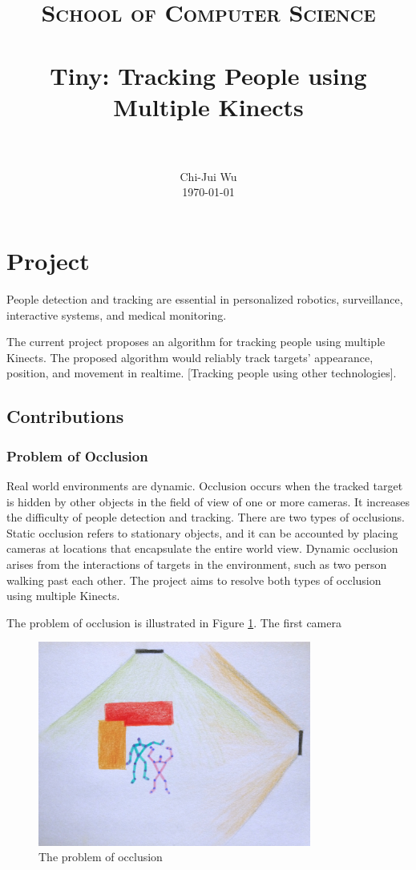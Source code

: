 \documentclass[paper=a4, fontsize=11pt]{scrartcl}
\title{
		\usefont{OT1}{bch}{b}{n}
		\normalfont \normalsize \textsc{School of Computer Science} \\ [25pt]
		\horrule{0.5pt} \\[0.4cm]
		\huge Tiny: Tracking People using Multiple Kinects \\
		\horrule{2pt} \\[0.5cm]
}
\author{
		\normalfont 								\normalsize
        Chi-Jui Wu\\[-3pt]		\normalsize
        \today
}
\date{}
\numberwithin{equation}{section}		%
\numberwithin{figure}{section}			%
\numberwithin{table}{section}				%
\begin{document}
\maketitle

\section{Project}

People detection and tracking are essential in personalized robotics, surveillance, interactive systems, and medical monitoring.

The current project proposes an algorithm for tracking people using multiple Kinects. The proposed algorithm would reliably track targets' appearance, position, and movement in realtime. [Tracking people using other technologies].

\subsection{Contributions}

\subsubsection{Problem of Occlusion}

Real world environments are dynamic. Occlusion occurs when the tracked target is hidden by other objects in the field of view of one or more cameras. It increases the difficulty of people detection and tracking. There are two types of occlusions. Static occlusion refers to stationary objects, and it can be accounted by placing cameras at locations that encapsulate the entire world view. Dynamic occlusion arises from the interactions of targets in the environment, such as two person walking past each other. The project aims to resolve both types of occlusion using multiple Kinects. 

The problem of occlusion is illustrated in Figure \ref{fig:occlusion_problem}. The first camera

\begin{figure}[p]
    \centering
    \includegraphics[width=0.8\textwidth]{occlusion}
    \caption{The problem of occlusion}
    \label{fig:occlusion_problem}
\end{figure}
\end{document}
